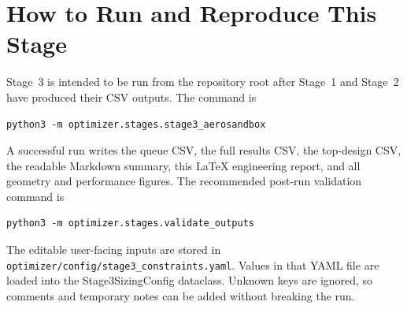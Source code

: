 \documentclass[11pt]{article}
\begin{document}
\section{How to Run and Reproduce This Stage}
Stage~3 is intended to be run from the repository root after Stage~1 and Stage~2 have produced their CSV outputs. The command is
\begin{verbatim}
python3 -m optimizer.stages.stage3_aerosandbox
\end{verbatim}
A successful run writes the queue CSV, the full results CSV, the top-design CSV, the readable Markdown summary, this LaTeX engineering report, and all geometry and performance figures. The recommended post-run validation command is
\begin{verbatim}
python3 -m optimizer.stages.validate_outputs
\end{verbatim}
The editable user-facing inputs are stored in \texttt{optimizer/config/stage3\_constraints.yaml}. Values in that YAML file are loaded into the Stage3SizingConfig dataclass. Unknown keys are ignored, so comments and temporary notes can be added without breaking the run.
\end{document}
